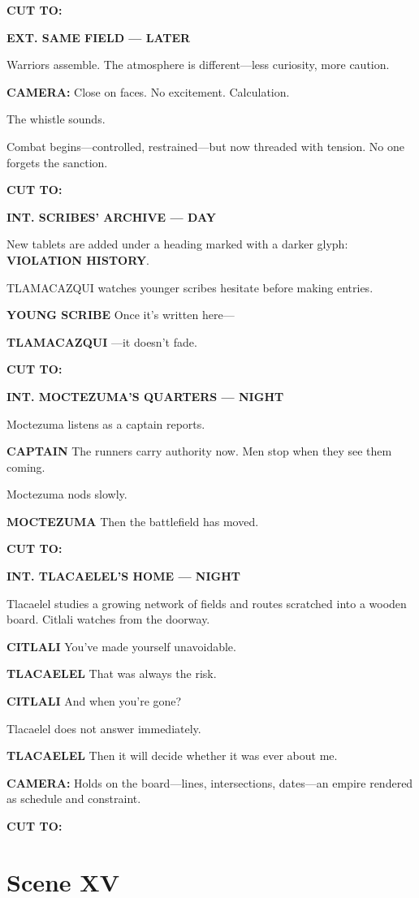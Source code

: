 \documentclass[12pt]{article}
\begin{document}
\textbf{CUT TO:}

\textbf{EXT. SAME FIELD — LATER}

Warriors assemble. The atmosphere is different—less curiosity, more caution.

\textbf{CAMERA:} Close on faces. No excitement. Calculation.

The whistle sounds.

Combat begins—controlled, restrained—but now threaded with tension. No one forgets the sanction.

\textbf{CUT TO:}

\textbf{INT. SCRIBES’ ARCHIVE — DAY}

New tablets are added under a heading marked with a darker glyph: \textbf{VIOLATION HISTORY}.

TLAMACAZQUI watches younger scribes hesitate before making entries.

\textbf{YOUNG SCRIBE}  
Once it’s written here—

\textbf{TLAMACAZQUI}  
—it doesn’t fade.

\textbf{CUT TO:}

\textbf{INT. MOCTEZUMA’S QUARTERS — NIGHT}

Moctezuma listens as a captain reports.

\textbf{CAPTAIN}  
The runners carry authority now.  
Men stop when they see them coming.

Moctezuma nods slowly.

\textbf{MOCTEZUMA}  
Then the battlefield has moved.

\textbf{CUT TO:}

\textbf{INT. TLACAELEL’S HOME — NIGHT}

Tlacaelel studies a growing network of fields and routes scratched into a wooden board. Citlali watches from the doorway.

\textbf{CITLALI}  
You’ve made yourself unavoidable.

\textbf{TLACAELEL}  
That was always the risk.

\textbf{CITLALI}  
And when you’re gone?

Tlacaelel does not answer immediately.

\textbf{TLACAELEL}  
Then it will decide  
whether it was ever about me.

\textbf{CAMERA:} Holds on the board—lines, intersections, dates—an empire rendered as schedule and constraint.

\textbf{CUT TO:}

\section*{Scene XV}
\end{document}
